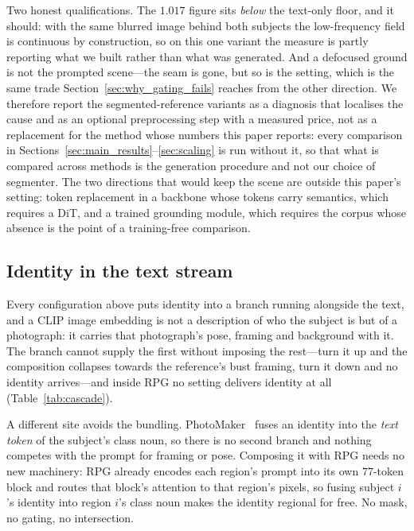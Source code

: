 \documentclass[10pt,twocolumn,letterpaper]{article}
\begin{document}
Two honest qualifications.  The $1.017$ figure sits \emph{below} the
text-only floor, and it should: with the same blurred image behind both
subjects the low-frequency field is continuous by construction, so on this
one variant the measure is partly reporting what we built rather than what
was generated.  And a defocused ground is not the prompted scene---the seam
is gone, but so is the setting, which is the same trade
Section~\ref{sec:why_gating_fails} reaches from the other direction.  We
therefore report the segmented-reference variants as a diagnosis that
localises the cause and as an optional preprocessing step with a measured
price, not as a replacement for the method whose numbers this paper reports:
every comparison in Sections~\ref{sec:main_results}--\ref{sec:scaling} is run
without it, so that what is compared across methods is the generation
procedure and not our choice of segmenter.  The
two directions that would keep the scene are outside this paper's setting:
token replacement in a backbone whose tokens carry semantics, which requires
a DiT, and a trained grounding module, which requires the corpus whose
absence is the point of a training-free comparison.

\subsection{Identity in the text stream}
\label{sec:textstream}

Every configuration above puts identity into a branch running alongside the
text, and a CLIP image embedding is not a description of who the subject is
but of a photograph: it carries that photograph's pose, framing and background
with it.  The branch cannot supply the first without imposing the rest---turn
it up and the composition collapses towards the reference's bust framing, turn
it down and no identity arrives---and inside RPG no setting delivers identity
at all (Table~\ref{tab:cascade}).

A different site avoids the bundling.  PhotoMaker~\cite{li2024photomaker}
fuses an identity into the \emph{text token} of the subject's class noun, so
there is no second branch and nothing competes with the prompt for framing or
pose.  Composing it with RPG needs no new machinery: RPG already encodes each
region's prompt into its own $77$-token block and routes that block's
attention to that region's pixels, so fusing subject $i$'s identity into
region $i$'s class noun makes the identity regional for free.  No mask, no
gating, no intersection.
\end{document}
